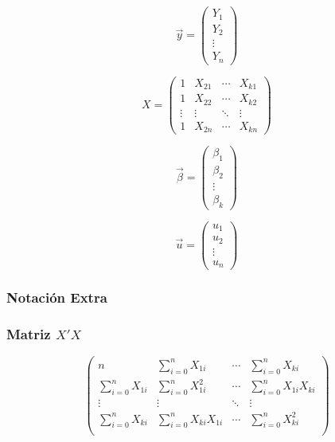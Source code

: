 \documentclass[a4paper,12pt]{article}
\newcommand{\ecuacion}[1]{\ensuremath{#1}}
\begin{document}
\begin{equation}
    \vec{y} = \begin{pmatrix}
    Y_1 \\
    Y_2 \\
    \vdots \\
    Y_n
    \end{pmatrix}
    \end{equation}
    
    \begin{equation}
    X = \begin{pmatrix}
    1 & X_{21} & \cdots & X_{k1} \\
    1 & X_{22} & \cdots & X_{k2} \\
    \vdots & \vdots & \ddots & \vdots \\
    1 & X_{2n} & \cdots & X_{kn}
    \end{pmatrix}
    \end{equation}
    
    \begin{equation}
    \vec{\beta} = \begin{pmatrix}
    \beta_1 \\
    \beta_2 \\
    \vdots \\
    \beta_k
    \end{pmatrix}
    \end{equation}
    
    \begin{equation}
    \vec{u} = \begin{pmatrix}
    u_1 \\
    u_2 \\
    \vdots \\
    u_n
    \end{pmatrix}
    \end{equation}



\subsubsection{Notación Extra}

\subsubsection*{Matriz \ecuacion{X'X}}

\begin{equation}
    \begin{pmatrix}
        n & \sum_{i=0}^n X_{1i} & \cdots & \sum_{i=0}^n X_{ki} \\
        \sum_{i=0}^n X_{1i} & \sum_{i=0}^n X_{1i}^2 & \cdots & \sum_{i=0}^n X_{1i}X_{ki} \\
        \vdots & \vdots & \ddots & \vdots \\
        \sum_{i=0}^n X_{ki} & \sum_{i=0}^n X_{ki}X_{1i} & \cdots & \sum_{i=0}^n X_{ki}^2 \\
    \end{pmatrix}
\end{equation}
\end{document}
